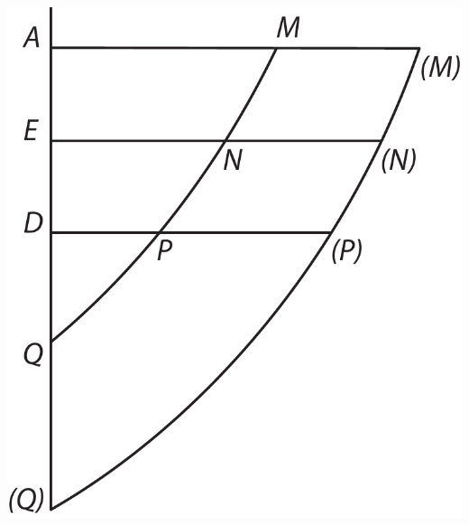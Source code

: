 \hspace*{21,9mm}
\begin{minipage}[t]{0.40\textwidth}
\hspace*{-5mm}
\includegraphics[trim = 0mm -3mm 0mm 0mm, clip, width=1\textwidth]{images/LH037,04_061v-d5.pdf}
\noindent {}
\end{minipage}
\pend
\newpage
